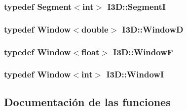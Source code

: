 \subsubsection[{\texorpdfstring{SegmentI}{SegmentI}}]{\setlength{\rightskip}{0pt plus 5cm}typedef Segment$<$int$>$ {\bf I3\+D\+::\+SegmentI}}\hypertarget{group___geometric_entities_ga929ca9aa27110ed7f1cf79c92664a6f0}{}\label{group___geometric_entities_ga929ca9aa27110ed7f1cf79c92664a6f0}
\subsubsection[{\texorpdfstring{WindowD}{WindowD}}]{\setlength{\rightskip}{0pt plus 5cm}typedef Window$<$double$>$ {\bf I3\+D\+::\+WindowD}}\hypertarget{group___geometric_entities_gac7dc7b0477e34c4c8c43a1710a855b00}{}\label{group___geometric_entities_gac7dc7b0477e34c4c8c43a1710a855b00}
\subsubsection[{\texorpdfstring{WindowF}{WindowF}}]{\setlength{\rightskip}{0pt plus 5cm}typedef Window$<$float$>$ {\bf I3\+D\+::\+WindowF}}\hypertarget{group___geometric_entities_ga76e43e50a665fdfb754f5825615ffaec}{}\label{group___geometric_entities_ga76e43e50a665fdfb754f5825615ffaec}
\subsubsection[{\texorpdfstring{WindowI}{WindowI}}]{\setlength{\rightskip}{0pt plus 5cm}typedef Window$<$int$>$ {\bf I3\+D\+::\+WindowI}}\hypertarget{group___geometric_entities_ga27980d94ceb3f3eb9e0c34e1fe93b073}{}\label{group___geometric_entities_ga27980d94ceb3f3eb9e0c34e1fe93b073}


\subsection{Documentación de las funciones}
